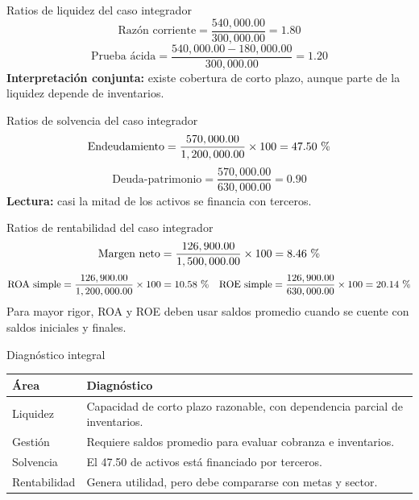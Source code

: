 \begin{frame}{Ratios de liquidez del caso integrador}
\[
\text{Razón corriente}=\frac{540,000.00}{300,000.00}=1.80
\]
\[
\text{Prueba ácida}=\frac{540,000.00-180,000.00}{300,000.00}=1.20
\]
\textbf{Interpretación conjunta:} existe cobertura de corto plazo, aunque parte de la liquidez depende de inventarios.
\end{frame}

\begin{frame}{Ratios de solvencia del caso integrador}
\[
\text{Endeudamiento}=\frac{570,000.00}{1,200,000.00}\times 100=47.50\text{ \char37}
\]
\[
\text{Deuda-patrimonio}=\frac{570,000.00}{630,000.00}=0.90
\]
\textbf{Lectura:} casi la mitad de los activos se financia con terceros.
\end{frame}

\begin{frame}{Ratios de rentabilidad del caso integrador}
\small
\[
\text{Margen neto}=\frac{126,900.00}{1,500,000.00}\times 100=8.46\text{ \char37}
\]
\[
\text{ROA simple}=\frac{126,900.00}{1,200,000.00}\times 100=10.58\text{ \char37}
\quad
\text{ROE simple}=\frac{126,900.00}{630,000.00}\times 100=20.14\text{ \char37}
\]
Para mayor rigor, ROA y ROE deben usar saldos promedio cuando se cuente con saldos iniciales y finales.
\end{frame}

\begin{frame}{Diagnóstico integral}
\begin{tabular}{p{}p{}}
\toprule
Área & Diagnóstico \\
\midrule
Liquidez & Capacidad de corto plazo razonable, con dependencia parcial de inventarios.\\
Gestión & Requiere saldos promedio para evaluar cobranza e inventarios.\\
Solvencia & El 47.50 \char37{} de activos está financiado por terceros.\\
Rentabilidad & Genera utilidad, pero debe compararse con metas y sector.\\
\bottomrule
\end{tabular}
\end{frame}
